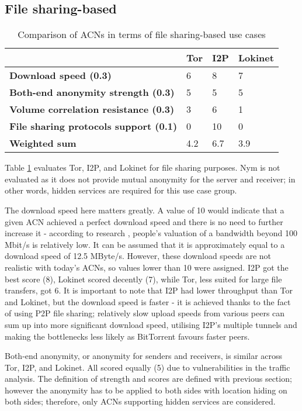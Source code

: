 \subsection{File sharing-based}

\begin{table}[!ht]
\caption{Comparison of ACNs in terms of file sharing-based use cases}
\label{tab:file_sharing_uc}
\small
\begin{tabular}{|p{}|p{}|p{}|p{}|}
\hline
\textbf{} & \textbf{Tor} & \textbf{I2P} & \textbf{Lokinet} \\
\hline
\textbf{Download speed (0.3)} & 6 & 8 & 7 \\
\hline
\textbf{Both-end anonymity strength (0.3)} & 5 & 5 & 5 \\
\hline
\textbf{Volume correlation resistance (0.3)} & 3 & 6 & 1 \\
\hline
\textbf{File sharing protocols support (0.1)} & 0 & 10 & 0 \\
\hline
\textbf{Weighted sum} & 4.2 & 6.7 & 3.9 \\
\hline
\end{tabular}
\end{table}

Table \ref{tab:file_sharing_uc} evaluates Tor, I2P, and Lokinet for file sharing purposes. Nym is not evaluated as it does not provide mutual anonymity for the server and receiver; in other words, hidden services are required for this use case group.

The download speed here matters greatly. A value of 10 would indicate that a given ACN achieved a perfect download speed and there is no need to further increase it - according to research \cite{internet-speed}, people's valuation of a bandwidth beyond 100 Mbit/s is relatively low. It can be assumed that it is approximately equal to a download speed of 12.5 MByte/s. However, these download speeds are not realistic with today's ACNs, so values lower than 10 were assigned. I2P got the best score (8), Lokinet scored decently (7), while Tor, less suited for large file transfers, got 6. It is important to note that I2P had lower throughput than Tor and Lokinet, but the download speed is faster - it is achieved thanks to the fact of using P2P file sharing; relatively slow upload speeds from various peers can sum up into more significant download speed, utilising I2P's multiple tunnels and making the bottlenecks less likely as BitTorrent favours faster peers.

Both-end anonymity, or anonymity for senders and receivers, is similar across Tor, I2P, and Lokinet. All scored equally (5) due to vulnerabilities in the traffic analysis. The definition of strength and scores are defined with previous section; however the anonymity has to be applied to both sides with location hiding on both sides; therefore, only ACNs supporting hidden services are considered.

